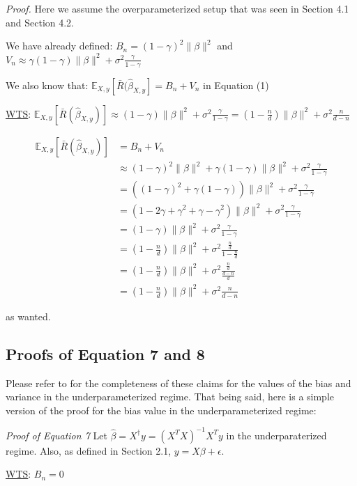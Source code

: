 \documentclass{article}
\begin{document}
\emph{Proof.}
Here we assume the overparameterized setup that was seen in Section 4.1 and Section 4.2.

We have already defined: 
$B_n = (1-\gamma)^2 \|\beta\|^2$ and 
$V_n \approx \gamma (1-\gamma) \|\beta\|^2 + \sigma^2 \frac{\gamma}{1-\gamma}$

We also know that: $\mathbb{E}_{X,y} [\bar{R} (\hat{\beta}_{X,y}] = B_n + V_n$ in Equation (1)

\underline{WTS}: $\mathbb{E}_{X,y} [\bar{R} (\hat{\beta}_{X,y})] \approx (1 - \gamma) \|\beta\|^2 + \sigma^2 \frac{\gamma}{1-\gamma} = (1- \frac{n}{d}) \|\beta\|^2 + \sigma^2 \frac{n}{d-n}$

\begin{align*}
    \mathbb{E}_{X,y} [\bar{R} (\hat{\beta}_{X,y})] &= B_n + V_n\\
    &\approx (1-\gamma)^2 \|\beta\|^2 + \gamma (1-\gamma) \|\beta\|^2 + \sigma^2 \frac{\gamma}{1-\gamma}\\
    &= ((1-\gamma)^2 + \gamma(1-\gamma)) \|\beta\|^2 + \sigma^2 \frac{\gamma}{1-\gamma}\\
    &= (1-2\gamma+\gamma^2+\gamma-\gamma^2)\|\beta\|^2 + \sigma^2 \frac{\gamma}{1-\gamma}\\
    &= (1-\gamma) \|\beta\|^2 + \sigma^2 \frac{\gamma}{1-\gamma}\\
    &= (1-\frac{n}{d}) \|\beta\|^2 + \sigma^2 \frac{\frac{n}{d}}{1-\frac{n}{d}}\\
    &= (1-\frac{n}{d}) \|\beta\|^2 + \sigma^2 \frac{\frac{n}{d}}{\frac{d-n}{d}}\\
    &= (1-\frac{n}{d}) \|\beta\|^2 + \sigma^2 \frac{n}{d-n}
\end{align*}

as wanted.

\subsection{Proofs of Equation 7 and 8}

Please refer to \cite{Hastie_2022} for the completeness of these claims for the values of the bias and variance in the underparameterized regime. That being said, here is a simple version of the proof for the bias value in the underparameterized regime:

\emph{Proof of Equation 7}
Let $\hat{\beta} = X^{\dagger}y = (X^{T}X)^{-1}X^{T}y$ in the underparaterized regime. Also, as defined in Section 2.1, $y = X\beta + \epsilon$.

\underline{WTS}: $B_n = 0$
\end{document}
